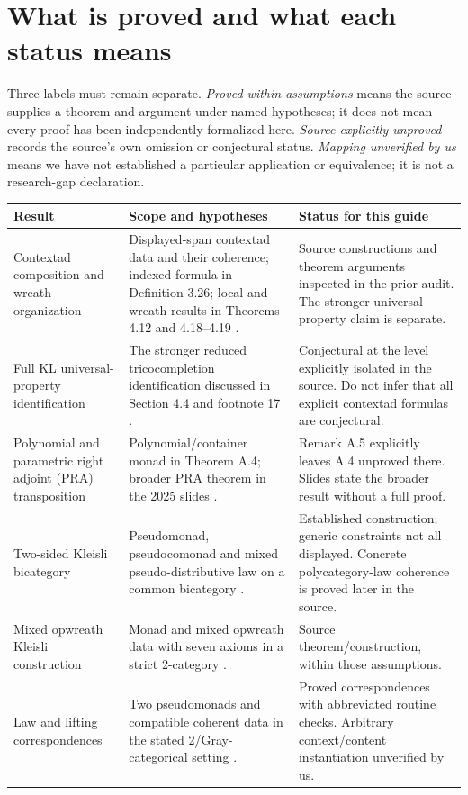 \documentclass[11pt,letterpaper]{article}
\begin{document}
\section{What is proved and what each status means}
\label{sec:status}
Three labels must remain separate. \emph{Proved within assumptions} means the source supplies a theorem and argument under named hypotheses; it does not mean every proof has been independently formalized here. \emph{Source explicitly unproved} records the source's own omission or conjectural status. \emph{Mapping unverified by us} means we have not established a particular application or equivalence; it is not a research-gap declaration.

\begin{longtable}{@{}p{}p{}p{}@{}}
\toprule
Result & Scope and hypotheses & Status for this guide \\
\midrule
\endhead
Contextad composition and wreath organization & Displayed-span contextad data and their coherence; indexed formula in Definition 3.26; local and wreath results in Theorems 4.12 and 4.18--4.19 \cite{CM}. & Source constructions and theorem arguments inspected in the prior audit. The stronger universal-property claim is separate. \\
Full KL universal-property identification & The stronger reduced tricocompletion identification discussed in Section 4.4 and footnote 17 \cite{CM}. & Conjectural at the level explicitly isolated in the source. Do not infer that all explicit contextad formulas are conjectural. \\
Polynomial and parametric right adjoint (PRA) transposition & Polynomial/container monad in Theorem A.4; broader PRA theorem in the 2025 slides \cite{CM,Slides}. & Remark A.5 explicitly leaves A.4 unproved there. Slides state the broader result without a full proof. \\
Two-sided Kleisli bicategory & Pseudomonad, pseudocomonad and mixed pseudo-distributive law on a common bicategory \cite[Definition 14]{Garner}. & Established construction; generic constraints not all displayed. Concrete polycategory-law coherence is proved later in the source. \\
Mixed opwreath Kleisli construction & Monad and mixed opwreath data with seven axioms in a strict 2-category \cite[Definition 5, Proposition 7]{Street}. & Source theorem/construction, within those assumptions. \\
Law and lifting correspondences & Two pseudomonads and compatible coherent data in the stated 2/Gray-categorical setting \cite{Walker,GL}. & Proved correspondences with abbreviated routine checks. Arbitrary context/content instantiation unverified by us. \\

\end{longtable}
\end{document}

